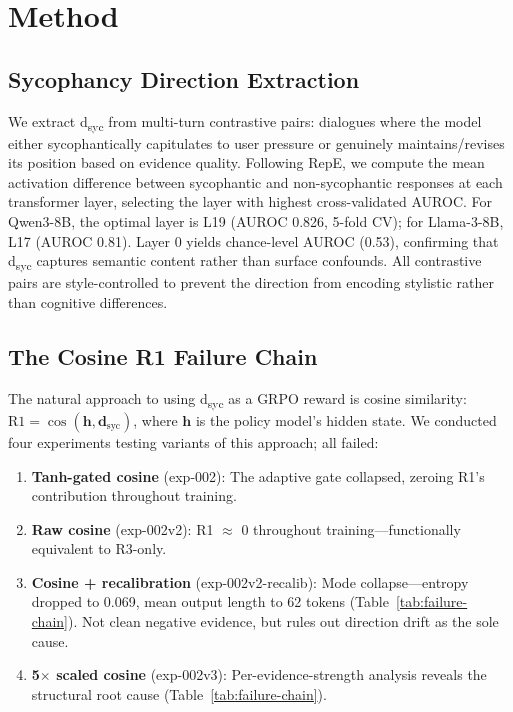 \documentclass[11pt,a4paper]{article}
\begin{document}
\section{Method}
\label{sec:method}

\subsection{Sycophancy Direction Extraction}
\label{sec:direction}

We extract d\textsubscript{syc} from multi-turn contrastive pairs: dialogues where the model either sycophantically capitulates to user pressure or genuinely maintains/revises its position based on evidence quality.
Following RepE, we compute the mean activation difference between sycophantic and non-sycophantic responses at each transformer layer, selecting the layer with highest cross-validated AUROC.
For Qwen3-8B, the optimal layer is L19 (AUROC 0.826, 5-fold CV); for Llama-3-8B, L17 (AUROC 0.81).
Layer 0 yields chance-level AUROC (0.53), confirming that d\textsubscript{syc} captures semantic content rather than surface confounds.
All contrastive pairs are style-controlled to prevent the direction from encoding stylistic rather than cognitive differences.

\subsection{The Cosine R1 Failure Chain}
\label{sec:failure-chain}

The natural approach to using d\textsubscript{syc} as a GRPO reward is cosine similarity: $\text{R1} = \cos(\mathbf{h}, \mathbf{d}_{\text{syc}})$, where $\mathbf{h}$ is the policy model's hidden state.
We conducted four experiments testing variants of this approach; all failed:

\begin{enumerate}
    \item \textbf{Tanh-gated cosine} (exp-002): The adaptive gate collapsed, zeroing R1's contribution throughout training.
    \item \textbf{Raw cosine} (exp-002v2): R1 $\approx$ 0 throughout training---functionally equivalent to R3-only.
    \item \textbf{Cosine + recalibration} (exp-002v2-recalib): Mode collapse---entropy dropped to 0.069, mean output length to 62 tokens (Table~\ref{tab:failure-chain}). Not clean negative evidence, but rules out direction drift as the sole cause.
    \item \textbf{5$\times$ scaled cosine} (exp-002v3): Per-evidence-strength analysis reveals the structural root cause (Table~\ref{tab:failure-chain}).
\end{enumerate}
\end{document}
